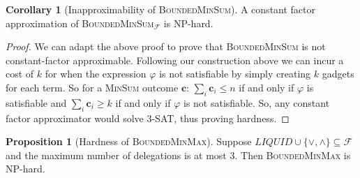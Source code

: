 \documentclass[11pt,a4paper, titlepage]{article}
\theoremstyle{definition}
\newtheorem{corollary}[theorem]{Corollary}
\newtheorem{proposition}[theorem]{Proposition}
\let\vec\mathbf
\begin{document}
\begin{corollary}[Inapproximability of \textsc{BoundedMinSum}] A constant factor approximation of \textsc{BoundedMinSum}$_\mathcal{F}$ is NP-hard.    
\end{corollary}

\begin{proof}
    We can adapt the above proof to prove that \textsc{BoundedMinSum} is not constant-factor approximable. Following our construction above we can incur a cost of $k$ for when the expression $\varphi$ is not satisfiable by simply creating $k$ gadgets for each term. So for a \textsc{MinSum} outcome $\vec{c}$:   $\sum_i \vec{c}_i \leq n$ if and only if $\varphi$ is satisfiable and $\sum_i \vec{c}_i \geq k$ if and only if $\varphi$ is not satisfiable. So, any constant factor approximator would solve \textsc{3-SAT}, thus proving hardness.
\end{proof}


\begin{proposition}[Hardness of \textsc{BoundedMinMax}]
    Suppose $\mathit{LIQUID} \cup \{\lor, \land\} \subseteq \mathcal{F}$ and the maximum number of delegations is at most 3. Then \textsc{BoundedMinMax} is NP-hard.    
\end{proposition}
\end{document}
